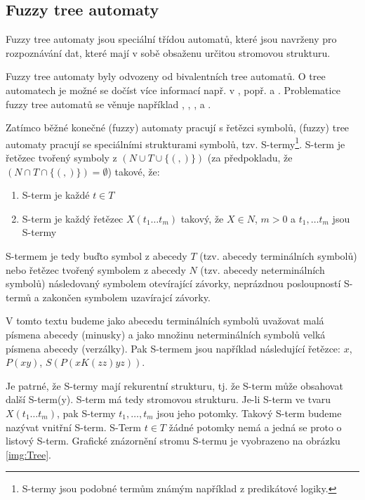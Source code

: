 \documentclass[a4paper,10pt]{article}
\begin{document}
\subsection{Fuzzy tree automaty}
Fuzzy tree automaty jsou speciální třídou automatů, které jsou navrženy pro rozpoznávání dat, které mají v sobě obsaženu určitou stromovou strukturu.

Fuzzy tree automaty byly odvozeny od  bivalentních tree automatů. O  tree automatech je možné se dočíst více informací např. v \cite{Com+-TreeAutTecApp}, popř. \cite{Hua-SyntPattRecSeisOilExp} a \cite{Bez+-FuzModAlgPatRecImProc}. Problematice fuzzy tree automatů se věnuje například \cite{Lee-FuzTreAutSynPatRec}, \cite{MogZadAme-NewDirInFuzzTreeAut}, \cite{ChaJos-NoteFuzzTreeAut}, \cite{EsiLiu-FuzzTreeAut} a \cite{MorMal-FuzzyAutLang}.

Zatímco běžné konečné (fuzzy) automaty pracují s řetězci symbolů, (fuzzy) tree automaty pracují se speciálními strukturami symbolů, tzv. S-termy\footnote{S-termy jsou podobné termům známým například z predikátové logiky.}. S-term je řetězec tvořený symboly z $(N \cup T \cup \{ (, ) \})$ (za předpokladu, že $(N \cap T \cap \{ (, ) \}) = \emptyset$) takové, že:
\begin{enumerate}
 \item S-term je každé $ t \in T$
 \item S-term je každý řetězec $ X ( t_1 \dots t_m )$ takový, že $X \in N$, $m > 0$ a $t_1, \dots t_m$ jsou S-termy
\end{enumerate}
S-termem je tedy buďto symbol z abecedy $T$ (tzv. abecedy terminálních symbolů) nebo řetězec tvořený symbolem z abecedy $N$ (tzv. abecedy neterminálních symbolů) následovaný symbolem otevírající závorky, neprázdnou posloupností S-termů a zakončen symbolem uzavírajcí závorky.

V tomto textu budeme jako abecedu terminálních symbolů uvažovat malá písmena abecedy (minusky) a jako množinu neterminálních symbolů velká písmena abecedy (verzálky). Pak S-termem jsou například následující řetězce: $x$, $P(x y)$, $S(P(x K(z z) y z))$.

Je patrné, že S-termy mají rekurentní strukturu, tj. že S-term může obsahovat další S-term(y). S-term má tedy stromovou strukturu. Je-li S-term ve tvaru $X(t_1 \dots t_m)$, pak S-termy $t_1, \dots, t_m$ jsou jeho potomky. Takový S-term budeme nazývat vnitřní S-term. S-Term $t \in T$ žádné potomky nemá a jedná se proto o listový S-term. Grafické znázornění stromu S-termu je vyobrazeno na obrázku \ref{img:Tree}.
\end{document}
